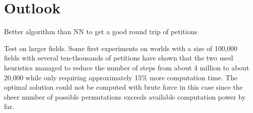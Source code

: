 \section{Outlook}

Better algorithm than NN to get a good round trip of petitions

Test on larger fields. Some first experiments on worlds with a size of 100,000 fields with several ten-thousands of petitions have shown that the two used heuristics managed to reduce the number of steps from about 4 million to about 20,000 while only requiring approximately 15\% more computation time. The optimal solution could not be computed with brute force in this case since the sheer number of possible permutations exceeds available computation power by far.